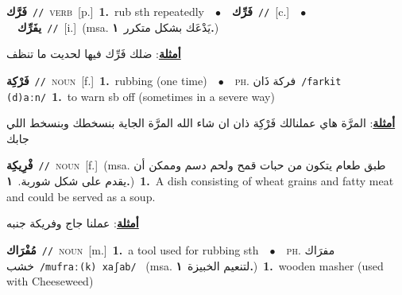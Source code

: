 \documentclass[10pt,a4paper,twoside]{article} %
\begin{document}
\begin{multicols}{2}
{\setlength\topsep{0pt}\textbf{\foreignlanguage{arabic}{فَرَّك}}\ {\color{gray}\texttt{//}\color{black}}\ \textsc{verb}\ [p.]\ \textbf{1.}~rub sth repeatedly\ \ $\bullet$\ \ \setlength\topsep{0pt}\textbf{\foreignlanguage{arabic}{فَرِّك}}\ {\color{gray}\texttt{//}\color{black}}\ [c.]\ \ $\bullet$\ \ \setlength\topsep{0pt}\textbf{\foreignlanguage{arabic}{يفَرِّك}}\ {\color{gray}\texttt{//}\color{black}}\ [i.]\ \color{gray}(msa. \foreignlanguage{arabic}{يَدْعَك بشكل متكرر}~\foreignlanguage{arabic}{\textbf{١.}})\color{black}\  \begin{flushright}\color{gray}\foreignlanguage{arabic}{\textbf{\underline{\foreignlanguage{arabic}{أمثلة}}}: ضلك فَرِّك فيها لحديت ما تنظف}\end{flushright}\color{black}} \vspace{2mm}

{\setlength\topsep{0pt}\textbf{\foreignlanguage{arabic}{فَرْكِة}}\ {\color{gray}\texttt{//}\color{black}}\ \textsc{noun}\ [f.]\ \textbf{1.}~rubbing (one time)\ \ $\bullet$\ \ \textsc{ph.} \color{gray} \foreignlanguage{arabic}{فركة ذَان}\color{black}\ {\color{gray}\texttt{/{\sffamily farkit (d)aːn}/}\color{black}}\ \textbf{1.}~to warn sb off (sometimes in a severe way)\  \begin{flushright}\color{gray}\foreignlanguage{arabic}{\textbf{\underline{\foreignlanguage{arabic}{أمثلة}}}: المرَّة هاي عملنالك فَرْكِة ذان ان شاء الله المرَّة الجاية بنسخطك وبنسخط اللي جابك}\end{flushright}\color{black}} \vspace{2mm}

{\setlength\topsep{0pt}\textbf{\foreignlanguage{arabic}{فْرِيكِة}}\ {\color{gray}\texttt{//}\color{black}}\ \textsc{noun}\ [f.]\ \color{gray}(msa. \foreignlanguage{arabic}{طبق طعام يتكون من حبات قمح ولحم دسم وممكن أن يقدم على شكل شوربة.}~\foreignlanguage{arabic}{\textbf{١.}})\color{black}\ \textbf{1.}~A dish consisting of wheat grains and fatty meat and could be served as a soup.\  \begin{flushright}\color{gray}\foreignlanguage{arabic}{\textbf{\underline{\foreignlanguage{arabic}{أمثلة}}}: عملنا جاج وفريكة جنبه}\end{flushright}\color{black}} \vspace{2mm}

{\setlength\topsep{0pt}\textbf{\foreignlanguage{arabic}{مُفْرَاك}}\ {\color{gray}\texttt{//}\color{black}}\ \textsc{noun}\ [m.]\ \textbf{1.}~a tool used for rubbing sth\ \ $\bullet$\ \ \textsc{ph.} \color{gray} \foreignlanguage{arabic}{مفرَاك خشب}\color{black}\ {\color{gray}\texttt{/{\sffamily mufraː(k) xaʃab}/}\color{black}}\ \color{gray} (msa. \foreignlanguage{arabic}{لتنعيم الخبيزة}~\foreignlanguage{arabic}{\textbf{١.}})\color{black}\ \textbf{1.}~wooden masher (used with Cheeseweed)\ } \vspace{2mm}


\end{multicols}
\end{document}
